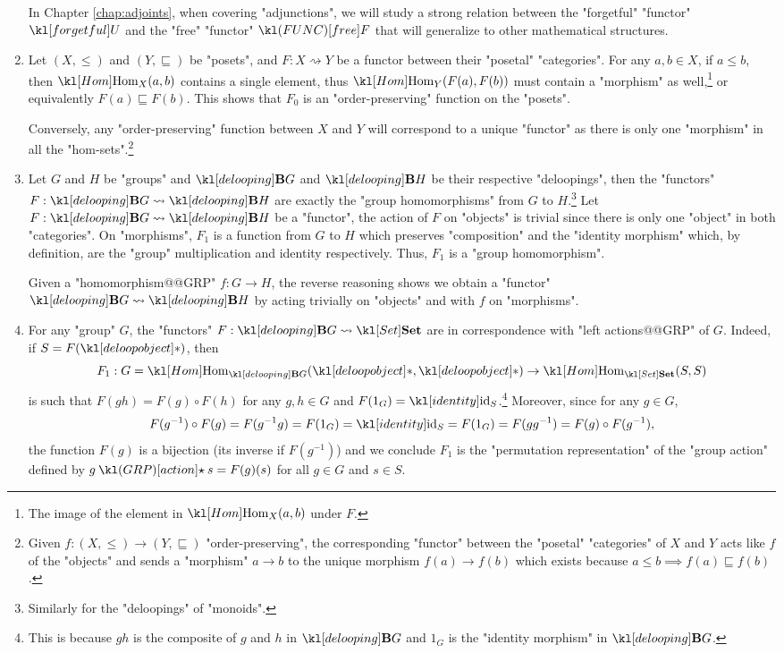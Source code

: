 \documentclass[main.tex]{subfiles}
\begin{document}
\begin{exmps}
\begin{enumerate}
		In Chapter \ref{chap:adjoints}, when covering "adjunctions", we will study a strong relation between the "forgetful" "functor" $\forget$ and the "free" "functor" $\free$ that will generalize to other mathematical structures.
		
		\item Let $(X, \leq)$ and $(Y, \sqsubseteq)$ be "posets", and $F:X\rightsquigarrow Y$ be a functor between their "posetal" "categories". For any $a, b \in X$, if $a\leq b$, then $\Hom_X(a,b)$ contains a single element, thus $\Hom_Y(F(a), F(b))$ must contain a "morphism" as well,\footnote{The image of the element in $\Hom_X(a,b)$ under $F$.} or equivalently $F(a) \sqsubseteq F(b)$. This shows that $F_0$ is an "order-preserving" function on the "posets".
		
		Conversely, any "order-preserving" function between $X$ and $Y$ will correspond to a unique "functor" as there is only one "morphism" in all the "hom-sets".\footnote{Given $f:(X,\leq) \rightarrow (Y,\sqsubseteq)$ "order-preserving", the corresponding "functor" between the "posetal" "categories" of $X$ and $Y$ acts like $f$ of the "objects" and sends a "morphism" $a \rightarrow b$ to the unique morphism $f(a) \rightarrow f(b)$ which exists because $a\leq b \implies f(a) \sqsubseteq f(b)$.}
				
		\item Let $G$ and $H$ be "groups" and $\deloop{G}$ and $\deloop{H}$ be their respective "deloopings", then the "functors" $F: \deloop{G} \rightsquigarrow \deloop{H}$ are exactly the "group homomorphisms" from $G$ to $H$.\footnote{Similarly for the "deloopings" of "monoids".} Let $F:\deloop{G} \rightsquigarrow \deloop{H}$ be a "functor", the action of $F$ on "objects" is trivial since there is only one "object" in both "categories". On "morphisms", $F_1$ is a function from $G$ to $H$ which preserves "composition" and the "identity morphism" which, by definition, are the "group" multiplication and identity respectively. Thus, $F_1$ is a "group homomorphism".
		
		Given a "homomorphism@@GRP" $f: G \rightarrow H$, the reverse reasoning shows we obtain a "functor" $\deloop{G} \rightsquigarrow \deloop{H}$ by acting trivially on "objects" and with $f$ on "morphisms".
		
		\item\label{exmp:functorgrpaction} For any "group" $G$, the "functors" $F:\deloop{G} \rightsquigarrow \catSet$ are in correspondence with "left actions@@GRP" of $G$. Indeed, if $S = F(\deloopobject)$, then \[F_1: G = \Hom_{\deloop{G}}(\deloopobject, \deloopobject) \rightarrow \Hom_{\catSet}(S, S)\]
		is such that $F(gh) = F(g) \circ F(h)$ for any $g,h \in G$ and $F(1_G) = \id_S$.\footnote{This is because $gh$ is the composite of $g$ and $h$ in $\deloop{G}$ and $1_G$ is the "identity morphism" in $\deloop{G}$.} Moreover, since for any $g \in G$,
		\[ F(g^{-1}) \circ F(g) = F(g^{-1}g) = F(1_G) = \id_S = F(1_G) = F(gg^{-1}) = F(g) \circ F(g^{-1}),\]
		the function $F(g)$ is a bijection (its inverse if $F(g^{-1})$) and we conclude $F_1$ is the "permutation representation" of the "group action" defined by $g \act s = F(g)(s)$ for all $g \in G$ and $s \in S$.


\end{enumerate}
\end{exmps}
\end{document}
